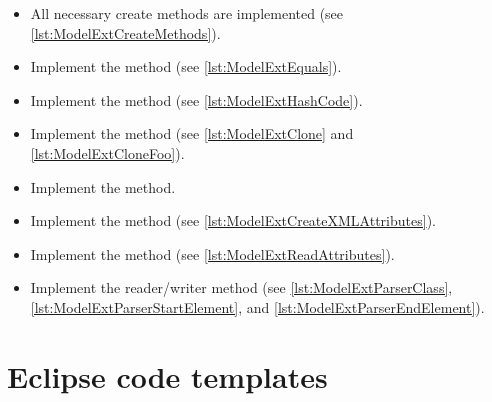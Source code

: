 \begin{itemize}[leftmargin=2em]
\begin{itemize}
  \item {}
    
  \item {}
    
  \item {}
    
  \item {}
    
  \item {}
    
  \item {}
    
  \item {}

  \end{itemize}

\item All necessary create methods are implemented (see 
  \vref{lst:ModelExtCreateMethods}).

\item Implement the  method (see 
  \vref{lst:ModelExtEquals}).

\item Implement the  method (see 
  \vref{lst:ModelExtHashCode}).

\item Implement the  method (see 
  \vref{lst:ModelExtClone} and \vref{lst:ModelExtCloneFoo}).

\item Implement the  method.

\item Implement the  method (see 
  \vref{lst:ModelExtCreateXMLAttributes}).

\item Implement the  method (see 
  \vref{lst:ModelExtReadAttributes}).
  
\item Implement the reader/writer method (see 
  \vref{lst:ModelExtParserClass},
  \vref{lst:ModelExtParserStartElement}, and
  \vref{lst:ModelExtParserEndElement}).
\end{itemize}


\section{Eclipse code templates}

